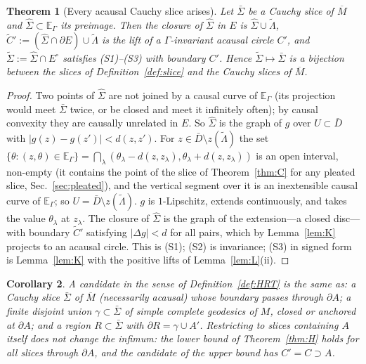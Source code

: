 \documentclass[aps,prd,onecolumn,superscriptaddress,nofootinbib,amsmath,amssymb,11pt]{revtex4-2}
\newtheorem{theorem}{Theorem}[section]
\newtheorem{corollary}[theorem]{Corollary}
\theoremstyle{definition}
\newcommand{\Mbar}{\overline{M}}
\newcommand{\EG}{\mathbb{E}_\Gamma}
\begin{document}
\begin{theorem}[Every acausal Cauchy slice arises]\label{thm:E}
Let $\bar\Sigma$ be a Cauchy slice of $\Mbar$ and $\hat\Sigma\subset\EG$ its preimage. Then the closure of $\hat\Sigma$ in $E$ is
$\hat\Sigma\cup\tilde\Lambda$, $\tilde C':=(\hat\Sigma\cap\partial E)\cup\tilde\Lambda$ is the lift of a $\Gamma$-invariant acausal circle
$C'$, and $\tilde\Sigma:=\hat\Sigma\cap E^\circ$ satisfies (S1)--(S3) with boundary $C'$. Hence $\tilde\Sigma\mapsto\bar\Sigma$ is a bijection
between the slices of Definition~\ref{def:slice} and the Cauchy slices of $\Mbar$.
\end{theorem}

\begin{proof}
Two points of $\hat\Sigma$ are not joined by a causal curve of $\EG$ (its projection would meet $\bar\Sigma$ twice, or be closed
and meet it infinitely often); by causal convexity they are causally unrelated in $E$. So $\hat\Sigma$ is the graph of $g$ over
$U\subset\bar D$ with $|g(z)-g(z')|<d(z,z')$. For $z\in\bar D\setminus z(\tilde\Lambda)$ the set $\{\theta:(z,\theta)\in\EG\}=
\bigcap_\lambda(\theta_\lambda-d(z,z_\lambda),\theta_\lambda+d(z,z_\lambda))$ is an open interval, non-empty (it contains the point of the
slice of Theorem~\ref{thm:C} for any pleated slice, Sec.~\ref{sec:pleated}), and the vertical segment over it is an
inextensible causal curve of $\EG$; so $U=\bar D\setminus z(\tilde\Lambda)$. $g$ is $1$-Lipschitz, extends continuously, and
takes the value $\theta_\lambda$ at $z_\lambda$. The closure of $\hat\Sigma$ is the graph of the extension---a closed disc---with
boundary $\tilde C'$ satisfying $|\Delta g|<d$ for all pairs, which by Lemma~\ref{lem:K} projects to an acausal circle. This is
(S1); (S2) is invariance; (S3) in signed form is Lemma~\ref{lem:K} with the positive lifts of Lemma~\ref{lem:L}(ii).
\end{proof}

\begin{corollary}\label{cor:HHLR}
A candidate in the sense of Definition~\ref{def:HRT} is the same as: a Cauchy slice $\bar\Sigma$ of $\Mbar$ (necessarily
acausal) whose boundary passes through $\partial A$; a finite disjoint union $\gamma\subset\bar\Sigma$ of simple complete
geodesics of $M$, closed or anchored at $\partial A$; and a region $R\subset\bar\Sigma$ with $\partial R=\gamma\cup A'$.
Restricting to slices containing $A$ itself does not change the infimum: the lower bound of Theorem~\ref{thm:H} holds for all
slices through $\partial A$, and the candidate of the upper bound has $C'=C\supset A$.
\end{corollary}
\end{document}
